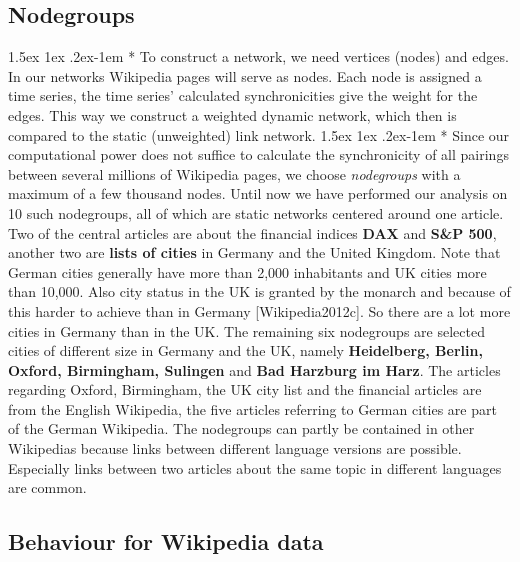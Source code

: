 \documentclass[a4paper,12pt,twoside]{article}
\makeatletter
\renewcommand{\paragraph}{%
  \@startsection{paragraph}{4}%
  {\z@}{1.5ex \@plus 1ex \@minus .2ex}{-1em}%
  {\normalfont\normalsize\bfseries}%
}
\makeatother
\begin{document}
\subsection{Nodegroups}
\label{ssec:nodegroups}
\paragraph*{} To construct a network, we need vertices (nodes) and edges. In our networks Wikipedia pages will serve as nodes. Each node is assigned a time series, the time series' calculated synchronicities give the weight for the edges. This way we construct a weighted dynamic network, which then is compared to the static (unweighted) link network.
\paragraph*{} Since our computational  power does not suffice to calculate the synchronicity of all pairings between several millions of Wikipedia pages, we choose \emph{nodegroups} with a maximum of a few thousand nodes. Until now we have performed our analysis on 10 such nodegroups, all of which are static networks centered around one article. Two of the central articles are about the financial indices {\bf DAX} and {\bf S\&P 500}, another two are {\bf lists of cities} in Germany and the United Kingdom. Note that German cities generally have more than 2,000 inhabitants and UK cities more than 10,000. Also city status in the UK is granted by the monarch and because of this harder to achieve than in Germany [{\sc Wikipedia}2012c]. So there are a lot more cities in Germany than in the UK. The remaining six nodegroups are selected cities of different size in Germany and the UK, namely {\bf Heidelberg, Berlin, Oxford, Birmingham, Sulingen} and {\bf Bad Harzburg im Harz}. The articles regarding Oxford, Birmingham, the UK city list and the financial articles are from the English Wikipedia, the five articles referring to German cities are part of the German Wikipedia. The nodegroups can partly be contained in other Wikipedias because links between different language versions are possible. Especially links between two articles about the same topic in different languages are common.
\newpage
%
\subsection{Behaviour for Wikipedia data}
\end{document}
